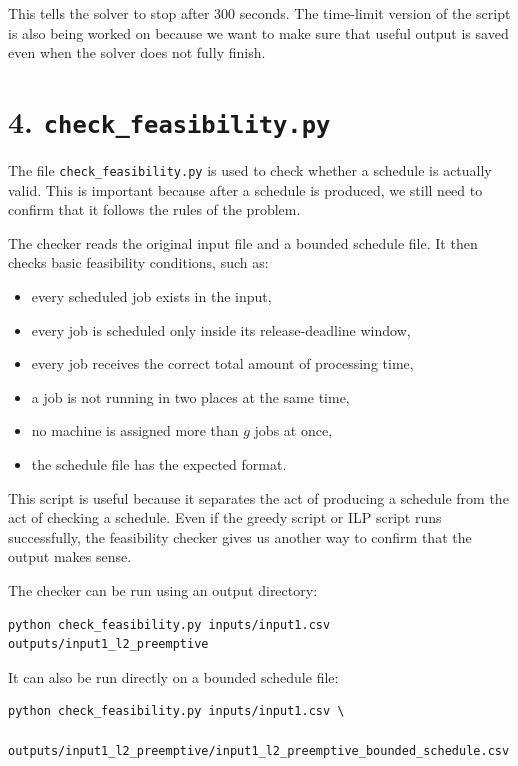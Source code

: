 \documentclass[12pt]{article}
\begin{document}
This tells the solver to stop after 300 seconds. The time-limit version of the
script is also being worked on because we want to make sure that useful output is
saved even when the solver does not fully finish.

\section*{4. \texttt{check\_feasibility.py}}

The file \texttt{check\_feasibility.py} is used to check whether a schedule is
actually valid. This is important because after a schedule is produced, we still
need to confirm that it follows the rules of the problem.

The checker reads the original input file and a bounded schedule file. It then
checks basic feasibility conditions, such as:

\begin{itemize}[leftmargin=*]
    \item every scheduled job exists in the input,
    \item every job is scheduled only inside its release-deadline window,
    \item every job receives the correct total amount of processing time,
    \item a job is not running in two places at the same time,
    \item no machine is assigned more than \(g\) jobs at once,
    \item the schedule file has the expected format.
\end{itemize}

This script is useful because it separates the act of producing a schedule from
the act of checking a schedule. Even if the greedy script or ILP script runs
successfully, the feasibility checker gives us another way to confirm that the
output makes sense.

The checker can be run using an output directory:

\begin{verbatim}
python check_feasibility.py inputs/input1.csv outputs/input1_l2_preemptive
\end{verbatim}

It can also be run directly on a bounded schedule file:

\begin{verbatim}
python check_feasibility.py inputs/input1.csv \
    outputs/input1_l2_preemptive/input1_l2_preemptive_bounded_schedule.csv
\end{verbatim}
\end{document}
